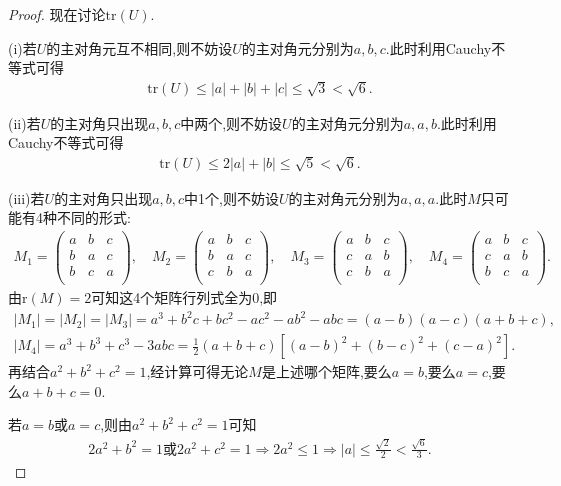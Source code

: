 \documentclass[../../main.tex]{subfiles}
\begin{document}
\begin{proof}
现在讨论$\mathrm{tr}(U)$.

(i)若$U$的主对角元互不相同,则不妨设$U$的主对角元分别为$a,b,c$.此时利用Cauchy不等式可得
\begin{align*}
\mathrm{tr}(U) \leqslant |a|+|b|+|c|\leqslant \sqrt{3}<\sqrt{6}.
\end{align*}

(ii)若$U$的主对角只出现$a,b,c$中两个,则不妨设$U$的主对角元分别为$a,a,b$.此时利用Cauchy不等式可得
\begin{align*}
\mathrm{tr}(U) \leqslant 2|a|+|b|\leqslant \sqrt{5}<\sqrt{6}.
\end{align*}

(iii)若$U$的主对角只出现$a,b,c$中1个,则不妨设$U$的主对角元分别为$a,a,a$.此时$M$只可能有4种不同的形式:
\begin{align*}
M_1=\begin{pmatrix}
a&		b&		c\\
b&		a&		c\\
b&		c&		a\\
\end{pmatrix},\quad M_2=\begin{pmatrix}
a&		b&		c\\
b&		a&		c\\
c&		b&		a\\
\end{pmatrix},\quad M_3=\begin{pmatrix}
a&		b&		c\\
c&		a&		b\\
c&		b&		a\\
\end{pmatrix},\quad M_4=\begin{pmatrix}
a&		b&		c\\
c&		a&		b\\
b&		c&		a\\
\end{pmatrix}.
\end{align*}
由$\mathrm{r}(M) =2$可知这4个矩阵行列式全为0,即
\begin{gather*}
|M_1|=|M_2|=|M_3|=a^3+b^2c+bc^2-ac^2-ab^2-abc=(a-b)(a-c)(a+b+c),
\\
|M_4|=a^3+b^3+c^3-3abc=\frac{1}{2}(a+b+c)\left[(a-b)^2+(b-c)^2+(c-a)^2\right].
\end{gather*}
再结合$a^2+b^2+c^2=1$,经计算可得无论$M$是上述哪个矩阵,要么$a=b$,要么$a=c$,要么$a+b+c=0$.

若$a=b$或$a=c$,则由$a^2+b^2+c^2=1$可知
\begin{align*}
2a^2+b^2=1\text{或}2a^2+c^2=1\Rightarrow 2a^2\leqslant 1\Rightarrow |a|\leqslant \frac{\sqrt{2}}{2}<\frac{\sqrt{6}}{3}.
\end{align*}


\end{proof}
\end{document}
